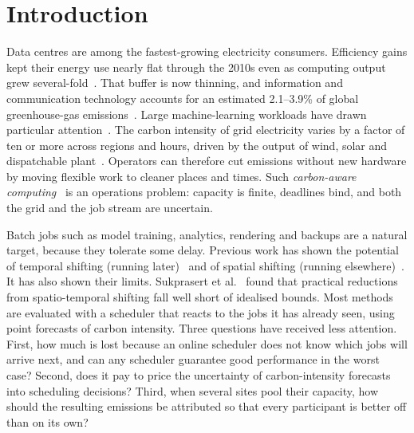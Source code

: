 \section{Introduction}\label{sec:intro}

Data centres are among the fastest-growing electricity consumers. Efficiency gains kept their energy use nearly flat through the 2010s even as computing output grew several-fold~\cite{masanet2020recalibrating,shehabi2016united}. That buffer is now thinning, and information and communication technology accounts for an estimated 2.1--3.9\% of global greenhouse-gas emissions~\cite{freitag2021real}. Large machine-learning workloads have drawn particular attention~\cite{strubell2019energy,patterson2022carbon,dodge2022measuring}. The carbon intensity of grid electricity varies by a factor of ten or more across regions and hours, driven by the output of wind, solar and dispatchable plant~\cite{staffell2017measuring}. Operators can therefore cut emissions without new hardware by moving flexible work to cleaner places and times. Such \emph{carbon-aware computing}~\cite{radovanovic2023carbon,bashir2021enabling} is an operations problem: capacity is finite, deadlines bind, and both the grid and the job stream are uncertain.

Batch jobs such as model training, analytics, rendering and backups are a natural target, because they tolerate some delay. Previous work has shown the potential of temporal shifting (running later)~\cite{wiesner2021lets,goiri2012greenhadoop,hanafy2023carbonscaler} and of spatial shifting (running elsewhere)~\cite{liu2011greening,zheng2020mitigating}. It has also shown their limits. Sukprasert et al.~\cite{sukprasert2024limitations} found that practical reductions from spatio-temporal shifting fall well short of idealised bounds. Most methods are evaluated with a scheduler that reacts to the jobs it has already seen, using point forecasts of carbon intensity. Three questions have received less attention. First, how much is lost because an online scheduler does not know which jobs will arrive next, and can any scheduler guarantee good performance in the worst case? Second, does it pay to price the uncertainty of carbon-intensity forecasts into scheduling decisions? Third, when several sites pool their capacity, how should the resulting emissions be attributed so that every participant is better off than on its own?

